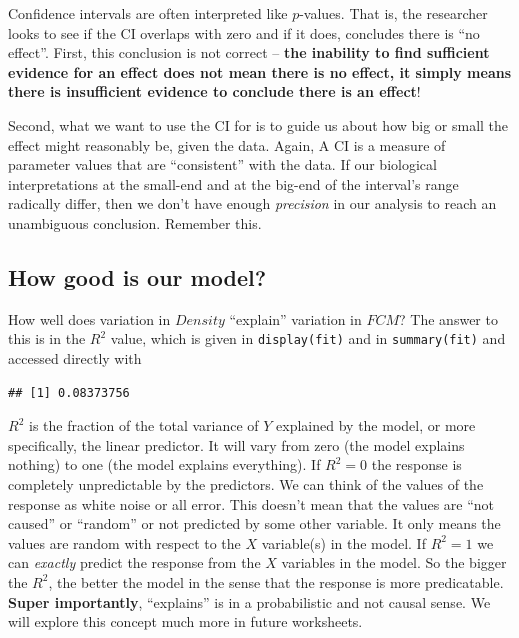 \documentclass[]{book}
\newenvironment{Shaded}{\begin{snugshade}}{\end{snugshade}}
\newcommand{\KeywordTok}[1]{\textcolor[rgb]{0.13,0.29,0.53}{\textbf{#1}}}
\newcommand{\OperatorTok}[1]{\textcolor[rgb]{0.81,0.36,0.00}{\textbf{#1}}}
\newcommand{\NormalTok}[1]{#1}
\theoremstyle{definition}
\theoremstyle{definition}
\theoremstyle{definition}
\theoremstyle{remark}
\begin{document}
Confidence intervals are often interpreted like \(p\)-values. That is,
the researcher looks to see if the CI overlaps with zero and if it does,
concludes there is ``no effect''. First, this conclusion is not correct
-- \textbf{the inability to find sufficient evidence for an effect does
not mean there is no effect, it simply means there is insufficient
evidence to conclude there is an effect}!

Second, what we want to use the CI for is to guide us about how big or
small the effect might reasonably be, given the data. Again, A CI is a
measure of parameter values that are ``consistent'' with the data. If
our biological interpretations at the small-end and at the big-end of
the interval's range radically differ, then we don't have enough
\emph{precision} in our analysis to reach an unambiguous conclusion.
Remember this.

\subsection{How good is our model?}\label{how-good-is-our-model}

How well does variation in \(Density\) ``explain'' variation in \(FCM\)?
The answer to this is in the \(R^2\) value, which is given in
\texttt{display(fit)} and in \texttt{summary(fit)} and accessed directly
with

\begin{Shaded}
\end{Shaded}

\begin{verbatim}
## [1] 0.08373756
\end{verbatim}

\(R^2\) is the fraction of the total variance of \(Y\) explained by the
model, or more specifically, the linear predictor. It will vary from
zero (the model explains nothing) to one (the model explains
everything). If \(R^2=0\) the response is completely unpredictable by
the predictors. We can think of the values of the response as white
noise or all error. This doesn't mean that the values are ``not caused''
or ``random'' or not predicted by some other variable. It only means the
values are random with respect to the \(X\) variable(s) in the model. If
\(R^2=1\) we can \emph{exactly} predict the response from the \(X\)
variables in the model. So the bigger the \(R^2\), the better the model
in the sense that the response is more predicatable. \textbf{Super
importantly}, ``explains'' is in a probabilistic and not causal sense.
We will explore this concept much more in future worksheets.
\end{document}
